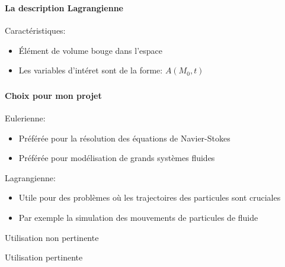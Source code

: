 \begin{frame}
\frametitle{\fstpti}
\framesubtitle{La description Lagrangienne}

\noindent
\begin{minipage}[t]{0.6\textwidth}
	Caractéristiques:
	\begin{itemize}
		\item Élément de volume bouge dans l'espace
		\item Les variables d'intéret sont de la forme: $A(M_0,t)$
	\end{itemize}
\end{minipage}%
\begin{minipage}[t]{0.4\textwidth}
\end{minipage}

\end{frame}


\begin{frame}
	\frametitle{\fstpti}
	\framesubtitle{Choix pour mon projet}

	\noindent
	\begin{minipage}[t]{0.5\textwidth}
		Eulerienne:
		\begin{itemize}
			\item Préférée pour la résolution des équations de Navier-Stokes
			\item Préférée pour modélisation de grands systèmes fluides
		\end{itemize}

	\end{minipage}%
	\begin{minipage}[t]{0.5\textwidth}
		Lagrangienne:
		\begin{itemize}
			\item Utile pour des problèmes où les trajectoires des particules sont cruciales
			\item Par exemple la simulation des mouvements de particules de fluide
		\end{itemize}

	\end{minipage}
	\newline
	\newline
	\newline
	\begin{minipage}[b]{0.5\textwidth}
		\textcolor{red}{\xmark} Utilisation non pertinente
	\end{minipage}%
	\begin{minipage}[b]{0.5\textwidth}
		\textcolor{green}{\cmark} Utilisation pertinente
	\end{minipage}%


\end{frame}

